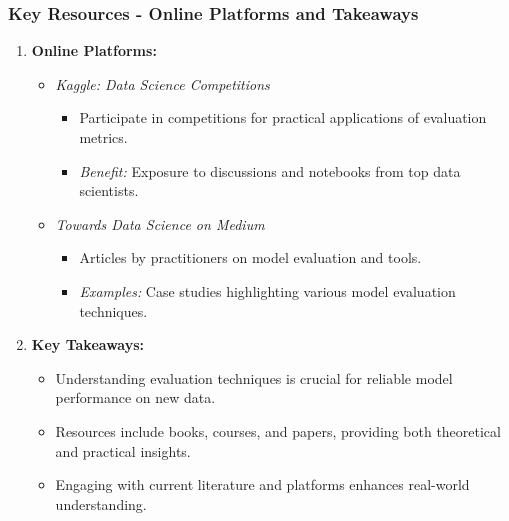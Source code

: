 \documentclass[aspectratio=169]{beamer}
\begin{document}
\begin{frame}[fragile]
    \frametitle{Key Resources - Online Platforms and Takeaways}
    \begin{enumerate}
        \item \textbf{Online Platforms:}
        \begin{itemize}
            \item \textit{Kaggle: Data Science Competitions}
            \begin{itemize}
                \item Participate in competitions for practical applications of evaluation metrics.
                \item \textit{Benefit:} Exposure to discussions and notebooks from top data scientists.
            \end{itemize}
            
            \item \textit{Towards Data Science on Medium}
            \begin{itemize}
                \item Articles by practitioners on model evaluation and tools.
                \item \textit{Examples:} Case studies highlighting various model evaluation techniques.
            \end{itemize}
        \end{itemize}
        
        \item \textbf{Key Takeaways:}
        \begin{itemize}
            \item Understanding evaluation techniques is crucial for reliable model performance on new data.
            \item Resources include books, courses, and papers, providing both theoretical and practical insights.
            \item Engaging with current literature and platforms enhances real-world understanding.
        \end{itemize}
    \end{enumerate}
\end{frame}
\end{document}
